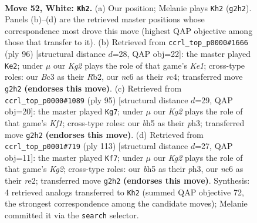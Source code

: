\documentclass[11pt]{article}
\begin{document}
\clearpage

\begin{figure}[p]\centering
\begin{subfigure}{0.46\textwidth}\centering
\resizebox{\linewidth}{!}{%
\newchessgame
\chessboard[
  setfen={3k4/3r4/p1n2P2/7b/1P6/2B5/P5K1/2R5 w - - 9 52},
  showmover=false,
  pgfstyle=straightmove, color=movearrow, markmove={g2-h2}
]}
\caption{}
\end{subfigure}\hfill
\begin{subfigure}{0.46\textwidth}\centering
\resizebox{\linewidth}{!}{%
\newchessgame
\chessboard[
  setfen={8/8/2k5/3npp2/2r5/P7/1RPB1P2/4K3 w - - 0 49},
  showmover=false,
  pgfstyle=straightmove, color=movearrow, markmove={e1-e2}
]}
\caption{}
\end{subfigure}
\\[4pt]
\begin{subfigure}{0.46\textwidth}\centering
\resizebox{\linewidth}{!}{%
\newchessgame
\chessboard[
  setfen={5k2/8/1r4p1/8/4R3/5PpP/4Nb2/7K b - - 3 48},
  showmover=false,
  pgfstyle=straightmove, color=movearrow, markmove={f8-g7}
]}
\caption{}
\end{subfigure}\hfill
\begin{subfigure}{0.46\textwidth}\centering
\resizebox{\linewidth}{!}{%
\newchessgame
\chessboard[
  setfen={8/4p1k1/5b2/1r4p1/8/5KPP/4R2N/8 b - - 18 57},
  showmover=false,
  pgfstyle=straightmove, color=movearrow, markmove={g7-f7}
]}
\caption{}
\end{subfigure}
\caption{\textbf{Move 52, White: \texttt{Kh2}.} (a) Our position; Melanie plays \texttt{Kh2} (\texttt{g2h2}). Panels (b)--(d) are the retrieved master positions whose correspondence most drove this move (highest QAP objective among those that transfer to it). (b) Retrieved from \texttt{ccrl\_top\_p0000\#1666} (ply 96) [structural distance $d$=28, QAP obj=22]: the master played \texttt{Ke2}; under $\mu$ our \emph{Kg2} plays the role of that game's \emph{Ke1}; cross-type roles: our \emph{B}c3 as their \emph{R}b2, our \emph{n}c6 as their \emph{r}c4; transferred move \texttt{g2h2} \textbf{(endorses this move)}. (c) Retrieved from \texttt{ccrl\_top\_p0000\#1089} (ply 95) [structural distance $d$=29, QAP obj=20]: the master played \texttt{Kg7}; under $\mu$ our \emph{Kg2} plays the role of that game's \emph{Kf1}; cross-type roles: our \emph{b}h5 as their \emph{p}h3; transferred move \texttt{g2h2} \textbf{(endorses this move)}. (d) Retrieved from \texttt{ccrl\_top\_p0001\#719} (ply 113) [structural distance $d$=27, QAP obj=11]: the master played \texttt{Kf7}; under $\mu$ our \emph{Kg2} plays the role of that game's \emph{Kg2}; cross-type roles: our \emph{b}h5 as their \emph{p}h3, our \emph{n}c6 as their \emph{r}e2; transferred move \texttt{g2h2} \textbf{(endorses this move)}. Synthesis: 4 retrieved analogs transferred to \texttt{Kh2} (summed QAP objective 72, the strongest correspondence among the candidate moves); Melanie committed it via the \texttt{search} selector.}
\label{fig:thought-m102}
\end{figure}
\end{document}
